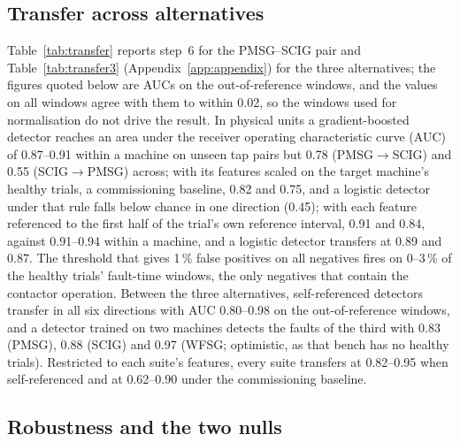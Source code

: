

\subsection{Transfer across alternatives}\label{sec:res-transfer}

Table~\ref{tab:transfer} reports step~6 for the PMSG--SCIG pair and Table~\ref{tab:transfer3} (Appendix~\ref{app:appendix}) for the three alternatives; the figures quoted below are AUCs on the out-of-reference windows, and the values on all windows agree with them to within 0.02, so the windows used for normalisation do not drive the result. In physical units a gradient-boosted detector reaches an area under the receiver operating characteristic curve (AUC) of 0.87--0.91 within a machine on unseen tap pairs but 0.78 (PMSG$\to$SCIG) and 0.55 (SCIG$\to$PMSG) across; with its features scaled on the target machine's healthy trials, a commissioning baseline, 0.82 and 0.75, and a logistic detector under that rule falls below chance in one direction (0.45); with each feature referenced to the first half of the trial's own reference interval, 0.91 and 0.84, against 0.91--0.94 within a machine, and a logistic detector transfers at 0.89 and 0.87. The threshold that gives 1\,\% false positives on all negatives fires on 0--3\,\% of the healthy trials' fault-time windows, the only negatives that contain the contactor operation. Between the three alternatives, self-referenced detectors transfer in all six directions with AUC 0.80--0.98 on the out-of-reference windows, and a detector trained on two machines detects the faults of the third with 0.83 (PMSG), 0.88 (SCIG) and 0.97 (WFSG; optimistic, as that bench has no healthy trials). Restricted to each suite's features, every suite transfers at 0.82--0.95 when self-referenced and at 0.62--0.90 under the commissioning baseline.



\subsection{Robustness and the two nulls}\label{sec:res-robust}

